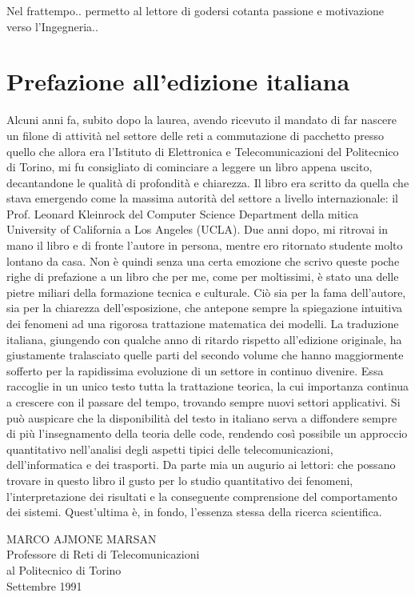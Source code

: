 
Nel frattempo.. permetto al lettore di godersi cotanta passione e motivazione verso l'Ingegneria..

\chapter{Prefazione all'edizione italiana}
\label{cap:prefaction}

Alcuni anni fa, subito dopo la laurea, avendo ricevuto il mandato di far nascere un filone di attività nel settore delle reti a commutazione di pacchetto presso quello che allora era l'Istituto di Elettronica e Telecomunicazioni del Politecnico di Torino, mi fu consigliato di cominciare a leggere un libro appena uscito, decantandone le qualità di profondità e chiarezza.
Il libro era scritto da quella che stava emergendo come la massima autorità del settore a livello internazionale: il Prof. Leonard Kleinrock del Computer Science Department della mitica University of California a Los Angeles (UCLA).
Due anni dopo, mi ritrovai in mano il libro e di fronte l'autore in persona, mentre ero ritornato studente molto lontano da casa.
Non è quindi senza una certa emozione che scrivo queste poche righe di prefazione a un libro che per me, come per moltissimi, è stato una delle pietre miliari della formazione tecnica e culturale. Ciò sia per la fama dell'autore, sia per la chiarezza dell'esposizione, che antepone sempre la spiegazione intuitiva dei fenomeni ad una rigorosa trattazione matematica dei modelli.
La traduzione italiana, giungendo con qualche anno di ritardo rispetto all'edizione originale, ha giustamente tralasciato quelle parti del secondo volume che hanno maggiormente sofferto per la rapidissima evoluzione di un settore in continuo divenire. Essa raccoglie in un unico testo tutta la trattazione teorica, la cui importanza continua a crescere con il passare del tempo, trovando sempre nuovi settori applicativi.
Si può auspicare che la disponibilità del testo in italiano serva a diffondere sempre di più l'insegnamento della teoria delle code, rendendo così possibile un approccio quantitativo nell'analisi degli aspetti tipici delle telecomunicazioni, dell'informatica e dei trasporti.
Da parte mia un augurio ai lettori: che possano trovare in questo libro il gusto per lo studio quantitativo dei fenomeni, l'interpretazione dei risultati e la conseguente comprensione del comportamento dei sistemi. Quest'ultima è, in fondo, l'essenza stessa della ricerca scientifica.

\bigskip

\begin{flushright}
MARCO AJMONE MARSAN\\
Professore di Reti di Telecomunicazioni\\al Politecnico di Torino\\
Settembre 1991
\end{flushright}